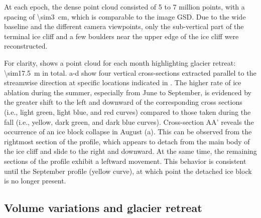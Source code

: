 At each epoch, the dense point cloud consisted of 5 to 7 million points,
with a spacing of \SI{\sim3}{\centi\meter}, which is comparable to the image GSD.
Due to the wide baseline and the different camera viewpoints, only the
sub-vertical part of the terminal ice cliff and a few boulders near the upper
edge of the ice cliff were reconstructed.

For clarity,  shows a point cloud for each month
highlighting glacier retreat: \SI{\sim17.5}{\meter} in total.
a-d show four vertical cross-sections extracted
parallel to the streamwise direction at specific locations indicated in
.
The higher rate of ice ablation during the summer, especially from June to September, is
evidenced by the greater shift to the left and downward of the corresponding cross
sections (i.e., light green, light blue, and red curves) compared to those taken during
the fall (i.e., yellow, dark green, and dark blue curves).
Cross-section AA' reveals the occurrence of an ice block collapse in August
(a).
This can be observed from the rightmost section of the profile, which appears to detach
from the main body of the ice cliff and slide to the right and downward.
At the same time, the remaining sections of the profile exhibit a leftward movement.
This behavior is consistent until the September profile (yellow
curve), at which point the detached ice block is no longer present.

\subsection{Volume variations and glacier retreat}\label{sec:4:res_volumes_retreat}

